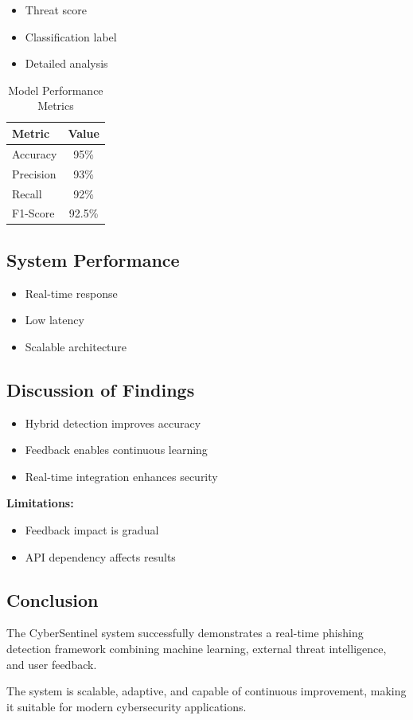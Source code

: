 \begin{itemize}
	\item Threat score
	\item Classification label
	\item Detailed analysis
\end{itemize}

\begin{table}[H]
	\centering
	\caption{Model Performance Metrics}
	\begin{tabular}{lc}
		\toprule
		\textbf{Metric} & \textbf{Value} \\
		\midrule
		Accuracy & 95\% \\
		Precision & 93\% \\
		Recall & 92\% \\
		F1-Score & 92.5\% \\
		\bottomrule
	\end{tabular}
\end{table}

\subsection{System Performance}

\begin{itemize}
	\item Real-time response
	\item Low latency
	\item Scalable architecture
\end{itemize}

\subsection{Discussion of Findings}

\begin{itemize}
	\item Hybrid detection improves accuracy
	\item Feedback enables continuous learning
	\item Real-time integration enhances security
\end{itemize}

\textbf{Limitations:}
\begin{itemize}
	\item Feedback impact is gradual
	\item API dependency affects results
\end{itemize}

\subsection{Conclusion}

The CyberSentinel system successfully demonstrates a real-time phishing detection framework combining machine learning, external threat intelligence, and user feedback.

The system is scalable, adaptive, and capable of continuous improvement, making it suitable for modern cybersecurity applications.